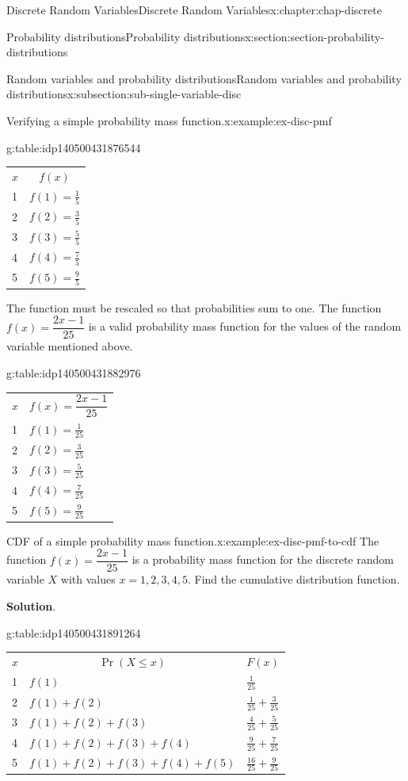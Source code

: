 \documentclass[oneside,10pt,]{book}
\newcommand{\blocktitlefont}{\relax}
\newcommand{\tabularfont}{\relax}
\newcommand{\hrulemedium}{\noalign{\hrule height 0.07em}}
\begin{document}
\begin{chapterptx}{Discrete Random Variables}{}{Discrete Random Variables}{}{}{x:chapter:chap-discrete}
\begin{sectionptx}{Probability distributions}{}{Probability distributions}{}{}{x:section:section-probability-distributions}
\begin{subsectionptx}{Random variables and probability distributions}{}{Random variables and probability distributions}{}{}{x:subsection:sub-single-variable-disc}
\begin{example}{Verifying a simple probability mass function.}{x:example:ex-disc-pmf}
\begin{equation*}
\end{equation*}
\begin{tableptx}{\textbf{}}{g:table:idp140500431876544}{}%
\centering
{\tabularfont%
\begin{tabular}{ll}
\multicolumn{1}{c}{\(x\)}&\multicolumn{1}{c}{\(f(x)\)}\tabularnewline\hrulemedium
1&\(f(1) = \frac{1}{5}\)\tabularnewline[0pt]
2&\(f(2) = \frac{3}{5}\)\tabularnewline[0pt]
3&\(f(3) = \frac{5}{5}\)\tabularnewline[0pt]
4&\(f(4) = \frac{7}{5}\)\tabularnewline[0pt]
5&\(f(5) = \frac{9}{5}\)
\end{tabular}
}%
\end{tableptx}%
 The function must be rescaled so that probabilities sum to one.  The function \(f(x) =
\dfrac{2x-1}{25}\) is a valid probability mass function for the values of the random variable mentioned above. \begin{tableptx}{\textbf{}}{g:table:idp140500431882976}{}%
\centering
{\tabularfont%
\begin{tabular}{ll}
\multicolumn{1}{c}{\(x\)}&\multicolumn{1}{c}{\(f(x) = \dfrac{2x-1}{25}\)}\tabularnewline\hrulemedium
1&\(f(1) = \frac{1}{25}\)\tabularnewline[0pt]
2&\(f(2) = \frac{3}{25}\)\tabularnewline[0pt]
3&\(f(3) = \frac{5}{25}\)\tabularnewline[0pt]
4&\(f(4) = \frac{7}{25}\)\tabularnewline[0pt]
5&\(f(5) = \frac{9}{25}\)
\end{tabular}
}%
\end{tableptx}%
%
\end{example}
\begin{example}{CDF of a simple probability mass function.}{x:example:ex-disc-pmf-to-cdf}%
The function \(f(x) = \dfrac{2x-1}{25}\) is a probability mass function for the discrete random variable \(X\) with values \(x=1,2,3,4,5\).  Find the cumulative distribution function.%
\par\smallskip%
\noindent\textbf{\blocktitlefont Solution}.\hypertarget{g:solution:idp140500431890880}{}\quad{}\begin{tableptx}{\textbf{}}{g:table:idp140500431891264}{}%
\centering
{\tabularfont%
\begin{tabular}{lll}
\multicolumn{1}{c}{\(x\)}&\multicolumn{1}{c}{\(\operatorname{Pr}(X \le x)\)}&\multicolumn{1}{c}{\(F(x)\)}\tabularnewline\hrulemedium
1&\(f(1) \)&\(\frac{1}{25}\)\tabularnewline[0pt]
2&\(f(1) + f(2) \)&\(\frac{1}{25} + \frac{3}{25}\)\tabularnewline[0pt]
3&\(f(1) + f(2) + f(3) \)&\(\frac{4}{25} + \frac{5}{25}\)\tabularnewline[0pt]
4&\(f(1) + f(2) + f(3) + f(4) \)&\(\frac{9}{25} + \frac{7}{25}\)\tabularnewline[0pt]
5&\(f(1) + f(2) + f(3) + f(4) + f(5) \)&\(\frac{16}{25} + \frac{9}{25}\)

\end{tabular}}
\end{tableptx}
\end{example}
\end{subsectionptx}
\end{sectionptx}
\end{chapterptx}
\end{document}
